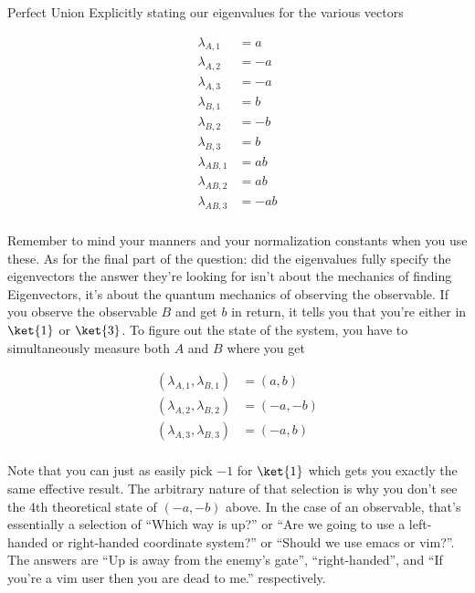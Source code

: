 \begin{answer}
\begin{answerpart}{Perfect Union}
    Explicitly stating our eigenvalues for the various vectors

    \begin{equation}
      \begin{split}
        \lambda_{A,1} &= a\\
        \lambda_{A,2} &= -a\\
        \lambda_{A,3} &= -a\\
        \lambda_{B,1} &= b\\
        \lambda_{B,2} &= -b\\
        \lambda_{B,3} &= b\\
        \lambda_{AB,1} &= ab\\
        \lambda_{AB,2} &= ab\\
        \lambda_{AB,3} &= -ab\\
      \end{split}
    \end{equation}

    Remember to mind your manners and your normalization constants
    when you use these.  As for the final part of the question: did
    the eigenvalues fully specify the eigenvectors the answer they're
    looking for isn't about the mechanics of finding Eigenvectors,
    it's about the quantum mechanics of observing the observable.  If
    you observe the observable $B$ and get $b$ in return, it tells you
    that you're either in $\ket{1}$ or $\ket{3}$.  To figure out the
    state of the system, you have to simultaneously measure both $A$
    and $B$ where you get

    \begin{equation}
      \begin{split}
        (\lambda_{A,1}, \lambda_{B,1}) &= (a, b)\\
        (\lambda_{A,2}, \lambda_{B,2}) &= (-a, -b)\\
        (\lambda_{A,3}, \lambda_{B,3}) &= (-a, b)\\
      \end{split}
    \end{equation}

    Note that you can just as easily pick $-1$ for $\ket{1}$ which
    gets you exactly the same effective result.  The arbitrary nature
    of that selection is why you don't see the 4th theoretical state
    of $(-a, -b)$ above.  In the case of an observable, that's
    essentially a selection of ``Which way is up?'' or ``Are we going
    to use a left-handed or right-handed coordinate system?'' or
    ``Should we use emacs or vim?''.  The answers are ``Up is away
    from the enemy's gate'', ``right-handed'', and ``If you're a vim
    user then you are dead to me.'' respectively.

  \end{answerpart}

\end{answer}
